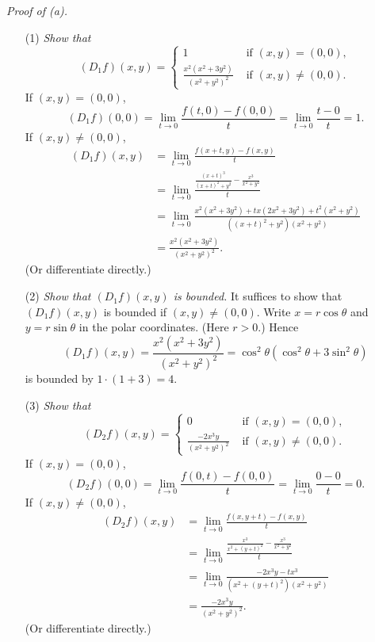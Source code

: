 \documentclass{article}
\begin{document}
\emph{Proof of (a).}
\begin{enumerate}
\item[(1)]
  \emph{Show that}
    \begin{equation*}
    (D_1 f)(x,y) =
      \begin{cases}
        1
          & \text{ if $(x,y)=(0,0)$}, \\
        \frac{x^2(x^2 +3y^2)}{(x^2+y^2)^2}
          & \text{ if $(x,y)\neq(0,0)$}.
      \end{cases}
    \end{equation*}
    If $(x,y) = (0,0)$,
    \[
      (D_1 f)(0,0)
      = \lim_{t \to 0} \frac{f(t,0) - f(0,0)}{t}
      = \lim_{t \to 0} \frac{t - 0}{t}
      = 1.
    \]
    If $(x,y) \neq (0,0)$,
    \begin{align*}
      (D_1 f)(x,y)
      &= \lim_{t \to 0} \frac{f(x+t,y) - f(x,y)}{t} \\
      &= \lim_{t \to 0} \frac{\frac{(x+t)^3}{(x+t)^2+y^2} - \frac{x^3}{x^2+y^2}}{t} \\
      &= \lim_{t \to 0}
        \frac{x^2(x^2+3y^2) + tx(2x^2+3y^2) + t^2(x^2+y^2)}{((x+t)^2+y^2)(x^2+y^2)} \\
      &= \frac{x^2(x^2 +3y^2)}{(x^2+y^2)^2}.
    \end{align*}
    (Or differentiate directly.)

\item[(2)]
  \emph{Show that $(D_1 f)(x,y)$ is bounded.}
  It suffices to show that $(D_1 f)(x,y)$ is bounded if $(x,y) \neq (0,0)$.
  Write $x = r\cos\theta$ and $y = r\sin\theta$ in the polar coordinates.
  (Here $r > 0$.)
  Hence
  \[
    (D_1 f)(x,y)
    = \frac{x^2(x^2 +3y^2)}{(x^2+y^2)^2}
    = \cos^2\theta (\cos^2\theta + 3\sin^2\theta)
  \]
  is bounded by $1\cdot(1+3) = 4$.

\item[(3)]
  \emph{Show that}
    \begin{equation*}
    (D_2 f)(x,y) =
      \begin{cases}
        0
          & \text{ if $(x,y)=(0,0)$}, \\
        \frac{-2x^3y}{(x^2+y^2)^2}
          & \text{ if $(x,y)\neq(0,0)$}.
      \end{cases}
    \end{equation*}
    If $(x,y) = (0,0)$,
    \[
      (D_2 f)(0,0)
      = \lim_{t \to 0} \frac{f(0,t) - f(0,0)}{t}
      = \lim_{t \to 0} \frac{0 - 0}{t}
      = 0.
    \]
    If $(x,y) \neq (0,0)$,
    \begin{align*}
      (D_2 f)(x,y)
      &= \lim_{t \to 0} \frac{f(x,y+t) - f(x,y)}{t} \\
      &= \lim_{t \to 0} \frac{\frac{x^3}{x^2+(y+t)^2} - \frac{x^3}{x^2+y^2}}{t} \\
      &= \lim_{t \to 0}
        \frac{-2x^3y - tx^3}{(x^2+(y+t)^2)(x^2+y^2)} \\
      &= \frac{-2x^3y}{(x^2+y^2)^2}.
    \end{align*}
    (Or differentiate directly.)


\end{enumerate}
\end{document}
